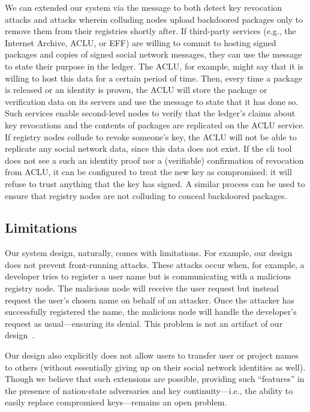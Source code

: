 We can extended our system via the \extensible message to both detect key
revocation attacks and attacks wherein colluding nodes upload backdoored
packages only to remove them from their registries shortly after. If
third-party services (e.g., the Internet Archive, ACLU, or EFF) are willing to
commit to hosting signed packages and copies of signed social network messages,
they can use the \extensible message to state their purpose in the ledger. The
ACLU, for example, might say that it is willing to host this data for a certain
period of time. Then, every time a package is released or an identity is
proven, the ACLU will store the package or verification data on its servers and
use the \extensible message to state that it has done so. Such services enable
second-level nodes to verify that the ledger's claims about key revocations and
the contents of packages are replicated on the ACLU service. If registry nodes
collude to revoke someone's key, the ACLU will not be able to replicate any
social network data, since this data does not exist. If the \spam{} cli tool
does not see a such an identity proof nor a (verifiable) confirmation of
revocation from ACLU, it can be configured to treat the new key as compromised:
it will refuse to trust anything that the key has signed. A similar process can
be used to ensure that registry nodes are not colluding to conceal backdoored
packages. 

\subsection{Limitations}
Our system design, naturally, comes with limitations.
%
For example, our design does not prevent front-running attacks. These attacks
occur when, for example, a developer tries to register a user name but is
communicating with a malicious registry node. The malicious node will receive
the user request but instead request the user's chosen name on behalf of an
attacker. Once the attacker has successfully registered the name, the malicious
node will handle the developer's request as usual---ensuring its denial. This
problem is not an artifact of our design~\cite{frontrunning}.

Our design also explicitly does not allow users to transfer user or project
names to others (without essentially giving up on their social network
identities as well).
%
Though we believe that such extensions are possible, providing such
``features'' in the presence of nation-state adversaries and key
continuity---i.e., the ability to easily replace compromised keys---remains an
open problem.


